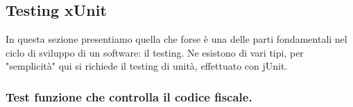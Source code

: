 \subsection{Testing xUnit}


\begin{flushleft}
    In questa sezione presentiamo quella che forse è una delle parti fondamentali nel ciclo di sviluppo di un software: il testing.
    Ne esistono di vari tipi, per "semplicità" qui si richiede il testing di unità, effettuato con jUnit.
\end{flushleft}

\subsubsection{Test funzione che controlla il codice fiscale.}

